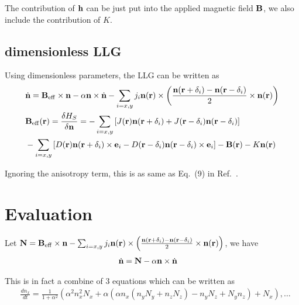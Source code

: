 \documentclass[aps,superscriptaddress,groupedaddress]{revtex4}  %
\begin{document}
The contribution of ${\bf h}$ can be just put into the applied magnetic field ${\bf B}$, we also include the contribution of $K$.

\subsection{\label{sec:2.6}dimensionless LLG}

Using dimensionless parameters, the LLG can be written as
\begin{equation}
\begin{split}
&\dot {\bf n}={\bf B}_{\rm eff}\times {\bf n}-\alpha {\bf n}\times \dot{\bf n}-\sum _{i=x,y}j_i{\bf n}({\bf r})\times \left(\frac{{\bf n}({\bf r}+\delta _i)-{\bf n}({\bf r}-\delta _i)}{2}\times {\bf n}({\bf r})\right)\\
&{\bf B}_{\rm eff}({\bf r})=\frac{\delta H_S}{\delta {\bf n}}=-\sum _{i=x,y}\left[J({\bf r}){\bf n}({\bf r}+\delta_i)+J({\bf r}-\delta_i){\bf n}({\bf r}-\delta_i)\right]\\
&-\sum _{i=x,y}\left[D({\bf r}){\bf n}({\bf r}+\delta_i)\times {{\bf e}}_i-D({\bf r}-\delta _i){\bf n}({\bf r}-\delta_i)\times {{\bf e}}_i\right]-{\bf B}({\bf r})-K {\bf n}({\bf r})
\end{split}
\end{equation}

Ignoring the anisotropy term, this is as same as Eq.~(9) in Ref.~\cite{pin}.

\section{\label{sec:3}Evaluation}

Let ${\bf N}={\bf B}_{\rm eff}\times {\bf n}-\sum _{i=x,y}j_i{\bf n}({\bf r})\times \left(\frac{{\bf n}({\bf r}+\delta _i)-{\bf n}({\bf r}-\delta _i)}{2}\times {\bf n}({\bf r})\right)$, we have
\begin{equation}
\begin{split}
&\dot {\bf n}={\bf N}-\alpha {\bf n}\times \dot{\bf n}
\end{split}
\end{equation}

This is in fact a combine of $3$ equations which can be written as
\begin{equation}
\begin{split}
&\frac{dn_x}{dt}=\frac{1}{1+\alpha ^2}\left(\alpha^2 n_x^2 N_x+\alpha (\alpha n_x (n_y N_y+n_z N_z)-n_y N_z+N_y n_z)+N_x\right),\ldots
\end{split}
\end{equation}
\end{document}
